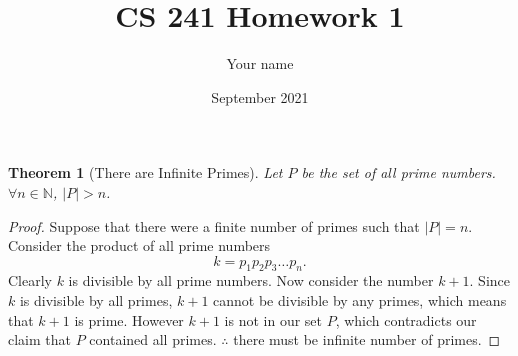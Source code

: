 \documentclass{article}
\title{CS 241 Homework 1}
\author{Your name}
\date{September 2021}
\newtheorem{theorem}{Theorem}
\begin{document}
\maketitle

\newpage

\begin{theorem}[There are Infinite Primes]
    Let $P$ be the set of all prime numbers. $\forall n\in\mathbb{N}$, $|P|>n$.
\end{theorem}
\begin{proof}
    Suppose that there were a finite number of primes such that $|P|=n$. Consider the product of all prime numbers
    \begin{equation}
        k = p_1p_2p_3\ldots p_n.
    \end{equation}
    Clearly $k$ is divisible by all prime numbers. Now consider the number $k+1$. Since $k$ is divisible by all primes, $k+1$ cannot be divisible by any primes, which means that $k+1$ is prime. However $k+1$ is not in our set $P$, which contradicts our claim that $P$ contained all primes. $\therefore$ there must be infinite number of primes. 
\end{proof}


\newpage
\end{document}
